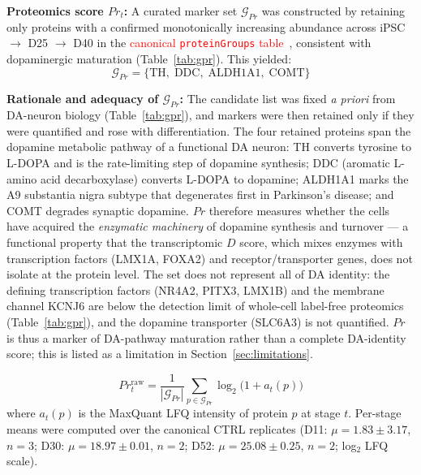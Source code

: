 \documentclass[5p,times,twocolumn]{elsarticle}
\newcommand{\rtag}[1]{}
\newenvironment{revblock}[1]{\par\color{red}\rtag{#1}\ignorespaces}{\par}
\newcommand{\lang}[1]{\textcolor{red}{#1}}
\begin{document}
\textbf{Proteomics score $Pr_{t}$:}
A curated marker set $\mathcal{G}_{Pr}$ was constructed by
retaining only proteins with a confirmed monotonically
increasing abundance across iPSC $\to$ D25 $\to$ D40 in
the \lang{canonical \texttt{proteinGroups} table}~\cite{novak2022single}, consistent with
dopaminergic maturation (Table~\ref{tab:gpr}).
This yielded:
%
\begin{equation}
  \mathcal{G}_{Pr} =
    \{\text{TH},\;\text{DDC},\;\text{ALDH1A1},\;\text{COMT}\}
  \label{eq:gpr}
\end{equation}
%
\begin{revblock}{R2.2,R2.14}
  \textbf{Rationale and adequacy of $\mathcal{G}_{Pr}$:}
  The candidate list was fixed \textit{a priori} from DA-neuron
  biology (Table~\ref{tab:gpr}), and markers were then retained
  only if they were quantified and rose with differentiation.
  The four retained proteins span the dopamine metabolic
  pathway of a functional DA neuron:
  TH converts tyrosine to L-DOPA and is the rate-limiting step of
  dopamine synthesis;
  DDC (aromatic L-amino acid decarboxylase) converts L-DOPA to
  dopamine;
  ALDH1A1 marks the A9 substantia nigra subtype that degenerates
  first in Parkinson's disease;
  and COMT degrades synaptic dopamine.
  $Pr$ therefore measures whether the cells have acquired the
  \textit{enzymatic machinery} of dopamine synthesis and turnover
  --- a functional property that the transcriptomic $D$ score,
  which mixes enzymes with transcription factors (LMX1A, FOXA2)
  and receptor/transporter genes, does not isolate at the protein
  level.
  The set does not represent all of DA identity: the defining
  transcription factors (NR4A2, PITX3, LMX1B) and the membrane
  channel KCNJ6 are below the detection limit of whole-cell
  label-free proteomics (Table~\ref{tab:gpr}), and the dopamine
  transporter (SLC6A3) is not quantified. $Pr$ is thus a marker
  of DA-pathway maturation rather than a complete DA-identity
  score; this is listed as a limitation in
  Section~\ref{sec:limitations}.
\end{revblock}
%
\begin{equation}
  Pr_{t}^{\text{raw}} =
    \frac{1}{|\mathcal{G}_{Pr}|}
    \sum_{p \in \mathcal{G}_{Pr}} \log_{2}\!\bigl(1 + a_{t}(p)\bigr)
  \label{eq:Pr}
\end{equation}
%
where $a_{t}(p)$ is the MaxQuant LFQ intensity of protein $p$
at stage $t$.
Per-stage means were computed over the canonical CTRL
replicates (D11: $\mu = 1.83 \pm 3.17$, $n = 3$;
D30: $\mu = 18.97 \pm 0.01$, $n = 2$;
D52: $\mu = 25.08 \pm 0.25$, $n = 2$; log$_{2}$ LFQ scale).
\end{document}
